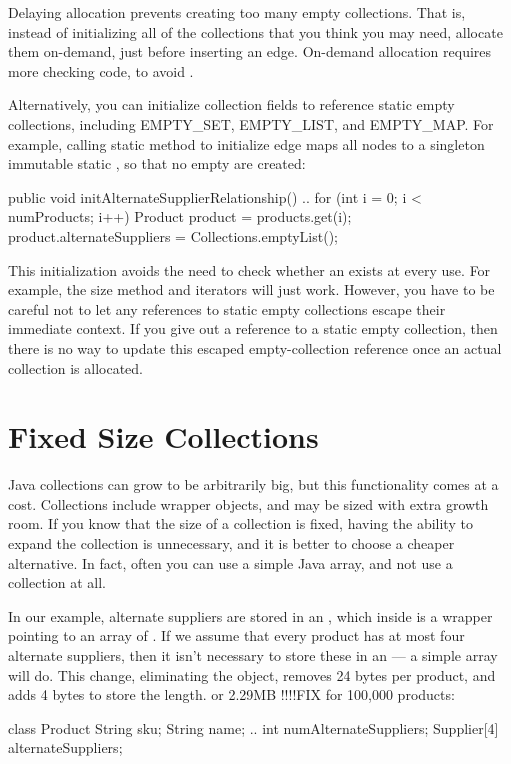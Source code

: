 Delaying allocation prevents creating too many empty collections.
 That is, instead of initializing all of the collections that you think you
 may need, allocate them on-demand, just before inserting an edge. On-demand
 allocation requires more checking code, to avoid .
 
 Alternatively, you can initialize collection fields to reference static empty collections,
 including EMPTY\_SET,
 EMPTY\_LIST, and EMPTY\_MAP. For example, 
 calling static method  to initialize edge
  maps all nodes to a singleton immutable static
 , so that no empty  are created:
 \begin{shortlisting}
     public void initAlternateSupplierRelationship() {
       ..
       for (int i = 0; i < numProducts; i++) {
          Product product = products.get(i);
          product.alternateSuppliers = Collections.emptyList();
       }
     } 
 \end{shortlisting}
This initialization avoids the need to check whether an 
exists at every use. For example, the size method and iterators will just work.
However, you have to be careful not to let any references to static empty
collections escape their immediate context. 
If you give out a reference to a static empty collection, 
then there is no way to update this escaped empty-collection reference
once an actual collection is allocated. 

\section{Fixed Size Collections}

Java collections can grow to be
arbitrarily big, but this functionality comes at a cost.
Collections include wrapper objects, and 
may be sized with extra growth room. If
you know that the size of a collection is fixed, having the ability to expand
the collection is unnecessary, and it is better to choose a cheaper alternative.
In fact, often you can use a
simple Java array, and not use a collection at all.  

In our example, alternate suppliers are stored in an
 , which inside is a
wrapper pointing to an array of .  If we assume that
every product has at most four alternate suppliers, then  it isn't 
necessary to store these in an  --- a simple array will do.
This change, eliminating the  object, removes 24 bytes per
product, and adds 4 bytes to store the length.  or 2.29MB !!!!FIX  for 100,000
products:
\begin{shortlisting} 
class Product {
	String sku;
	String name;
	.. 
	int numAlternateSuppliers;
	Supplier[4] alternateSuppliers;
}
\end{shortlisting}
 

